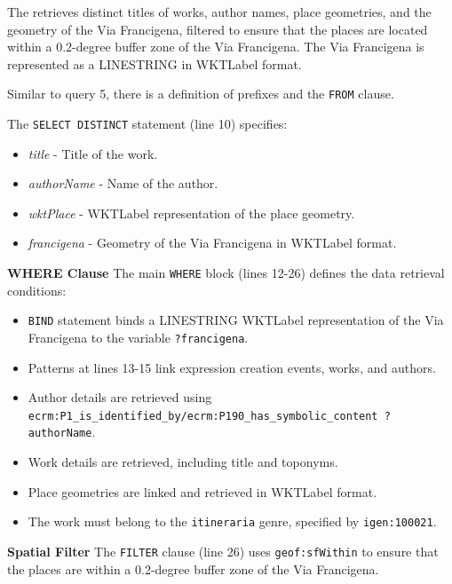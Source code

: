 The  retrieves distinct titles of works, author names, place geometries, and the geometry of the Via Francigena, filtered to ensure that the places are located within a 0.2-degree buffer zone of the Via Francigena. The Via Francigena is represented as a LINESTRING in \acrshort{WKTLabel} format.

Similar to query 5, there is a definition of prefixes and the \texttt{FROM} clause.

The \texttt{SELECT DISTINCT} statement (line 10) specifies:
\begin{itemize}
    \item \textit{title} - Title of the work.
    \item \textit{authorName} - Name of the author.
    \item \textit{wktPlace} - \acrshort{WKTLabel} representation of the place geometry.
    \item \textit{francigena} - Geometry of the Via Francigena in \acrshort{WKTLabel} format.
\end{itemize}

\textbf{WHERE Clause}
The main \texttt{WHERE} block (lines 12-26) defines the data retrieval conditions:
\begin{itemize}
    \item \texttt{BIND} statement binds a LINESTRING \acrshort{WKTLabel} representation of the Via Francigena to the variable \texttt{?francigena}.
    \item Patterns at lines 13-15 link expression creation events, works, and authors.
    \item Author details are retrieved using  \\ \texttt{ecrm:P1\_is\_identified\_by/ecrm:P190\_has\_symbolic\_content ?authorName}.
    \item Work details are retrieved, including title and toponyms.
    \item Place geometries are linked and retrieved in \acrshort{WKTLabel} format.
    \item The work must belong to the \texttt{itineraria} genre, specified by \texttt{igen:100021}.
\end{itemize}

\textbf{Spatial Filter}
The \texttt{FILTER} clause (line 26) uses \texttt{geof:sfWithin} to ensure that the places are within a 0.2-degree buffer zone of the Via Francigena.

